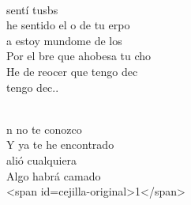\begin{cancion}
\begin{chorus}
\jump\\
	sentí tusbs\\
	he sentido el o de tu erpo\\
	a estoy mundome de los \\
	Por el bre que ahobesa tu cho\\
	He de reocer que tengo dec\\
	tengo dec..\\
	\end{chorus}%
	\jump\\
	n no te conozco\\
Y ya te he encontrado\\
	alió cualquiera\\
	Algo habrá camado\\
<span id=cejilla-original>1</span>\\
\end{cancion}%
